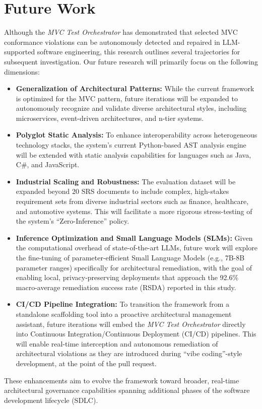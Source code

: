 \section{Future Work}
\label{sec:future}

Although the \textit{MVC Test Orchestrator} has demonstrated that selected MVC conformance violations can be autonomously detected and repaired in LLM-supported software engineering, this research outlines several trajectories for subsequent investigation. Our future research will primarily focus on the following dimensions:

\begin{itemize}
    \item \textbf{Generalization of Architectural Patterns:} While the current framework is optimized for the MVC pattern, future iterations will be expanded to autonomously recognize and validate diverse architectural styles, including microservices, event-driven architectures, and n-tier systems.
    
    \item \textbf{Polyglot Static Analysis:} To enhance interoperability across heterogeneous technology stacks, the system's current Python-based AST analysis engine will be extended with static analysis capabilities for languages such as Java, C\#, and JavaScript.
    
    \item \textbf{Industrial Scaling and Robustness:} The evaluation dataset will be expanded beyond 20 SRS documents to include complex, high-stakes requirement sets from diverse industrial sectors such as finance, healthcare, and automotive systems. This will facilitate a more rigorous stress-testing of the system's ``Zero-Inference'' policy.
    
    \item \textbf{Inference Optimization and Small Language Models (SLMs):} Given the computational overhead of state-of-the-art LLMs, future work will explore the fine-tuning of parameter-efficient Small Language Models (e.g., 7B-8B parameter ranges) specifically for architectural remediation, with the goal of enabling local, privacy-preserving deployments that approach the 92.6\% macro-average remediation success rate (RSDA) reported in this study.
    
    \item \textbf{CI/CD Pipeline Integration:} To transition the framework from a standalone scaffolding tool into a proactive architectural management assistant, future iterations will embed the \textit{MVC Test Orchestrator} directly into Continuous Integration/Continuous Deployment (CI/CD) pipelines. This will enable real-time interception and autonomous remediation of architectural violations as they are introduced during ``vibe coding''-style development, at the point of the pull request.
\end{itemize}

These enhancements aim to evolve the framework toward broader, real-time architectural governance capabilities spanning additional phases of the software development lifecycle (SDLC).